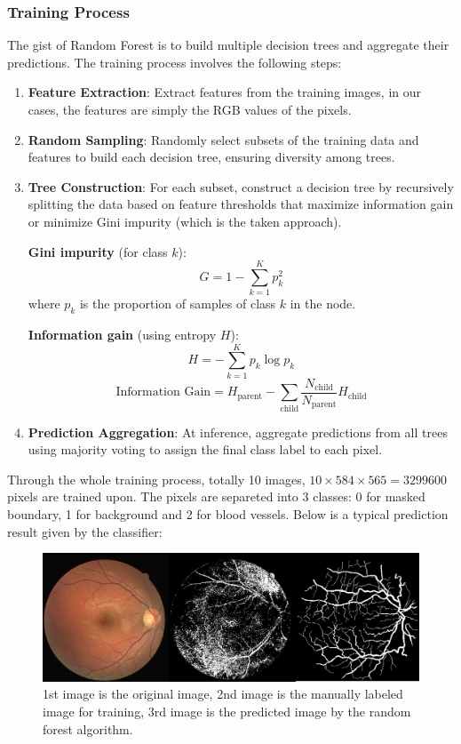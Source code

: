 \documentclass[12pt,letterpaper]{article}
\begin{document}
\subsubsection{Training Process}
The gist of Random Forest is to build multiple decision trees and aggregate their predictions. The training process involves the following steps:
\begin{enumerate}
    \item \textbf{Feature Extraction}: Extract features from the training images, in our cases, the features are simply the RGB values of the pixels.
    \item \textbf{Random Sampling}: Randomly select subsets of the training data and features to build each decision tree, ensuring diversity among trees.
    \item \textbf{Tree Construction}: For each subset, construct a decision tree by recursively splitting the data based on feature thresholds that maximize information gain or minimize Gini impurity (which is the taken approach).
    
\textbf{Gini impurity} (for class \( k \)):  
\[
G = 1 - \sum_{k=1}^K p_k^2
\]  
where \( p_k \) is the proportion of samples of class \( k \) in the node.  

\textbf{Information gain} (using entropy \( H \)):  
\[
H = -\sum_{k=1}^K p_k \log p_k
\]  
\[
\text{Information Gain} = H_{\text{parent}} - \sum_{\text{child}} \frac{N_{\text{child}}}{N_{\text{parent}}} H_{\text{child}}
\]  

    \item \textbf{Prediction Aggregation}: At inference, aggregate predictions from all trees using majority voting to assign the final class label to each pixel.
\end{enumerate}

    Through the whole training process, totally 10 images, \(10 \times 584 \times 565 = 3299600\) pixels are trained upon. The pixels are separeted into 3 classes: 0 for masked boundary, 1 for background and 2 for blood vessels. Below is a typical prediction result given by the classifier:

    \begin{figure}[H]
        \centering
            \centering
            \includegraphics[scale=0.4]{Figures/mjc.png}
            \caption{1st image is the original image, 2nd image is the manually labeled image for training, 3rd image is the predicted image by the random forest algorithm.}\label{fig:mjct27}
    \end{figure}
    \noindent
\end{document}
